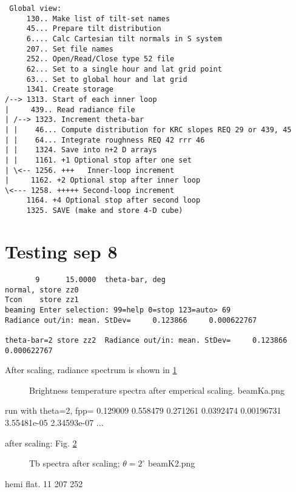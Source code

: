 \documentclass{article}
\begin{document}
\begin{verbatim}
 Global view:
     130.. Make list of tilt-set names
     45... Prepare tilt distribution
     6.... Calc Cartesian tilt normals in S system
     207.. Set file names
     252.. Open/Read/Close type 52 file
     62... Set to a single hour and lat grid point
     63... Set to global hour and lat grid
     1341. Create storage
/--> 1313. Start of each inner loop
|     439.. Read radiance file
| /--> 1323. Increment theta-bar
| |    46... Compute distribution for KRC slopes REQ 29 or 439, 45
| |    64... Integrate roughness REQ 42 rrr 46 
| |    1324. Save into n+2 D arrays
| |    1161. +1 Optional stop after one set
| \<-- 1256. +++   Inner-loop increment
|     1162. +2 Optional stop after inner loop
\<--- 1258. +++++ Second-loop increment
     1164. +4 Optional stop after second loop
     1325. SAVE (make and store 4-D cube)
\end{verbatim}
\vspace{-3.mm} 


\section{Testing sep 8}
\vspace{-3.mm} 
\begin{verbatim}
       9      15.0000  theta-bar, deg
normal, store zz0
Tcon    store zz1
beaming Enter selection: 99=help 0=stop 123=auto> 69
Radiance out/in: mean. StDev=     0.123866     0.000622767

theta-bar=2 store zz2  Radiance out/in: mean. StDev=     0.123866   0.000622767
\end{verbatim} 
After scaling, radiance spectrum is shown in 
\ref{beamKa}
\begin{figure}[!ht] 
\caption[First try]{Brightness temperature spectra after emperical scaling.
\label{beamKa} beamKa.png  }
\end{figure} 


run with theta=2, fpp=  0.129009     0.558479     0.271261    0.0392474   0.00196731  3.55481e-05  2.34593e-07 ...

after scaling: Fig.
\ref{beamK2}
\begin{figure}[!ht] 
\caption[nill slope]{Tb spectra after scaling; $\theta=2^\circ$
\label{beamK2}  beamK2.png  }
\end{figure} 

hemi flat.  11 207 252 
\end{document}
